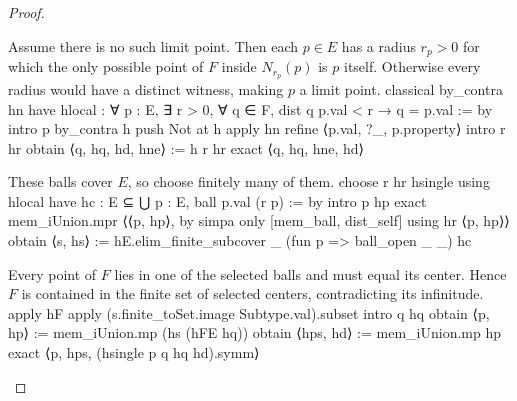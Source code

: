 \begin{proof}
  \begin{lean}{Assume there is no such limit point. Then each $p\in E$ has a radius $r_p>0$ for which the only possible point of $F$ inside $N_{r_p}(p)$ is $p$ itself. Otherwise every radius would have a distinct witness, making $p$ a limit point.}
    classical
    by_contra hn
    have hlocal : ∀ p : E, ∃ r > 0, ∀ q ∈ F, dist q p.val < r → q = p.val := by
      intro p
      by_contra h
      push Not at h
      apply hn
      refine ⟨p.val, ?_, p.property⟩
      intro r hr
      obtain ⟨q, hq, hd, hne⟩ := h r hr
      exact ⟨q, hq, hne, hd⟩
  \end{lean}

  \begin{lean}{These balls cover $E$, so choose finitely many of them.}
    choose r hr hsingle using hlocal
    have hc : E ⊆ ⋃ p : E, ball p.val (r p) := by
      intro p hp
      exact mem_iUnion.mpr ⟨⟨p, hp⟩, by simpa only [mem_ball, dist_self] using hr ⟨p, hp⟩⟩
    obtain ⟨s, hs⟩ := hE.elim_finite_subcover _ (fun p => ball_open _ _) hc
  \end{lean}

  \begin{lean}{Every point of $F$ lies in one of the selected balls and must equal its center. Hence $F$ is contained in the finite set of selected centers, contradicting its infinitude.}
    apply hF
    apply (s.finite_toSet.image Subtype.val).subset
    intro q hq
    obtain ⟨p, hp⟩ := mem_iUnion.mp (hs (hFE hq))
    obtain ⟨hps, hd⟩ := mem_iUnion.mp hp
    exact ⟨p, hps, (hsingle p q hq hd).symm⟩
  \end{lean}

\end{proof}

